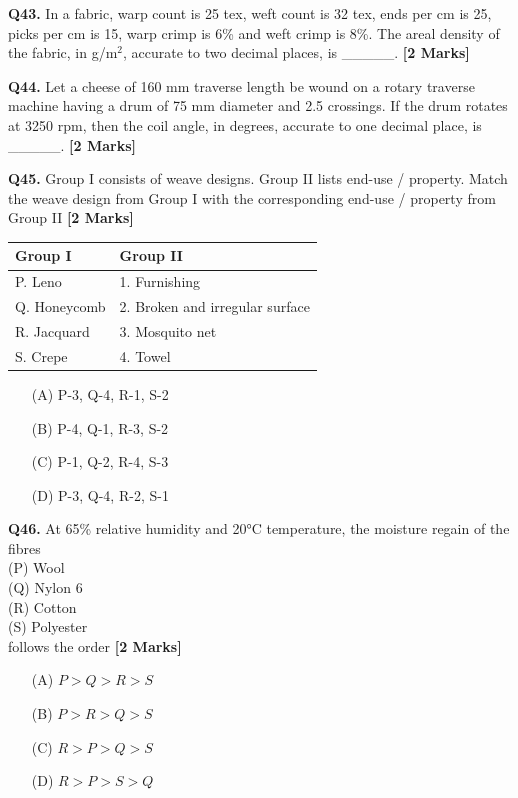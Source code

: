 \documentclass[11pt]{article}
\newcommand{\questionb}[2]{
    \noindent\textbf{Q#2.} #1 \hfill \textbf{[2 Marks]}
}
\begin{document}
\questionb{In a fabric, warp count is 25 tex, weft count is 32 tex, ends per cm is 25, picks per cm is 15, warp crimp is 6\% and weft crimp is 8\%. The areal density of the fabric, in g/m\(^2\), accurate to two decimal places, is \_\_\_\_\_.}{43}
\vspace{0.5cm}

\questionb{Let a cheese of 160 mm traverse length be wound on a rotary traverse machine having a drum of 75 mm diameter and 2.5 crossings. If the drum rotates at 3250 rpm, then the coil angle, in degrees, accurate to one decimal place, is \_\_\_\_\_.}{44}
\vspace{0.5cm}

\questionb{Group I consists of weave designs. Group II lists end-use / property. Match the weave design from Group I with the corresponding end-use / property from Group II}{45}

\begin{center}
\begin{tabular}{|l|l|}
\hline
\textbf{Group I} & \textbf{Group II} \\
\hline
P. Leno & 1. Furnishing \\
Q. Honeycomb & 2. Broken and irregular surface \\
R. Jacquard & 3. Mosquito net \\
S. Crepe & 4. Towel \\
\hline
\end{tabular}
\end{center}

\begin{enumerate}
    \item[(A)] P-3, Q-4, R-1, S-2  
    \item[(B)] P-4, Q-1, R-3, S-2  
    \item[(C)] P-1, Q-2, R-4, S-3  
    \item[(D)] P-3, Q-4, R-2, S-1  
\end{enumerate}
\vspace{0.5cm}

\questionb{At 65\% relative humidity and 20°C temperature, the moisture regain of the fibres\\
(P) Wool  \\
(Q) Nylon 6  \\
(R) Cotton  \\
(S) Polyester \\ 
follows the order  }{46}
\begin{enumerate}
    \item[(A)] \( P > Q > R > S \)  
    \item[(B)] \( P > R > Q > S \)  
    \item[(C)] \( R > P > Q > S \)  
    \item[(D)] \( R > P > S > Q \)  
\end{enumerate}
\vspace{0.5cm}
\end{document}
